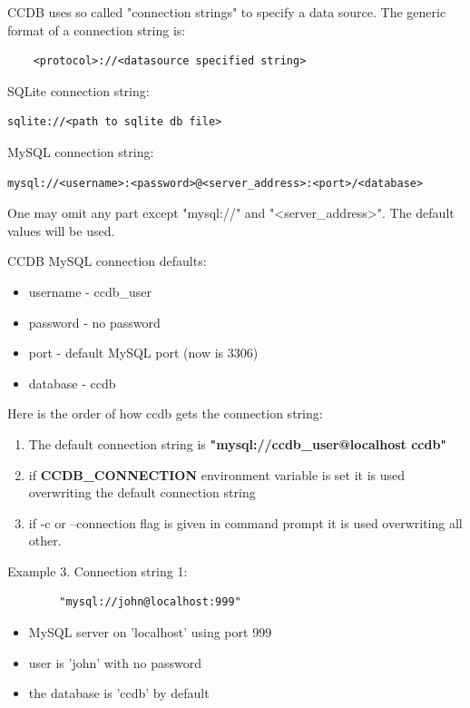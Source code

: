 \documentclass{article}
\begin{document}
CCDB uses so called "connection strings" to specify a data source.
The generic format of a connection string is:
\begin{verbatim}
    <protocol>://<datasource specified string>
\end{verbatim}

SQLite connection string:
\begin{verbatim}
sqlite://<path to sqlite db file>
\end{verbatim}

MySQL connection string:
\begin{verbatim}
mysql://<username>:<password>@<server_address>:<port>/<database>
\end{verbatim}

One may omit any part except "mysql://" and "<server\_address>". The default
values will be used.

CCDB MySQL connection defaults:
\begin{itemize}
  \item username - ccdb\_user
  \item password - no password
  \item port - default MySQL port (now is 3306)
  \item database - ccdb
\end{itemize}


Here is the order of how ccdb gets the connection string:
\begin{enumerate}
  \item The default connection string is  \textbf{"mysql://ccdb\_user@localhost ccdb"}

  \item if \textbf{CCDB\_CONNECTION} environment variable is set it is used overwriting
        the default connection string

  \item if -c or --connection flag is given in command prompt it is used overwriting
        all other.
\end{enumerate}

Example 3. Connection string 1:

\begin{verbatim}
        "mysql://john@localhost:999"
\end{verbatim}


\begin{itemize}
  \item MySQL server on 'localhost' using port 999
  \item user is 'john' with no password
  \item the database is 'ccdb' by default
\end{itemize}
\end{document}
